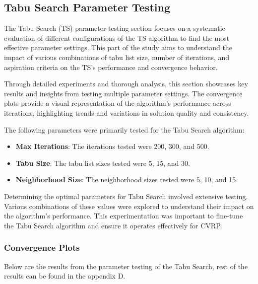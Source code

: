 \documentclass{article}
\begin{document}
    \clearpage

    \newpage

    \subsection{Tabu Search Parameter Testing}

    The Tabu Search (TS) parameter testing section focuses on a systematic evaluation of different configurations of the TS algorithm to find the most effective parameter settings. This part of the study aims to understand the impact of various combinations of tabu list size, number of iterations, and aspiration criteria on the TS's performance and convergence behavior.

    Through detailed experiments and thorough analysis, this section showcases key results and insights from testing multiple parameter settings. The convergence plots provide a visual representation of the algorithm’s performance across iterations, highlighting trends and variations in solution quality and consistency.


    The following parameters were primarily tested for the Tabu Search algorithm:

    \begin{itemize}
        \item \textbf{Max Iterations}: The iterations tested were 200, 300, and 500.
        \item \textbf{Tabu Size}: The tabu list sizes tested were 5, 15, and 30.
        \item \textbf{Neighborhood Size}: The neighborhood sizes tested were 5, 10, and 15.
    \end{itemize}

    Determining the optimal parameters for Tabu Search involved extensive testing. Various combinations of these values were explored to understand their impact on the algorithm's performance. This experimentation was important to fine-tune the Tabu Search algorithm and ensure it operates effectively for CVRP.

    \subsubsection{Convergence Plots}
    Below are the results from the parameter testing of the Tabu Search, rest of the results can be found in the appendix D.
\end{document}
